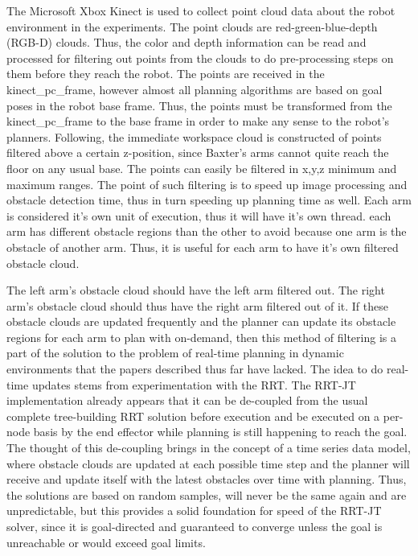 \documentclass[conference]{IEEEtran} \usepackage[T1]{fontenc} \usepackage[backend=biber, style=ieee]{biblatex}
\begin{document}
The Microsoft Xbox Kinect is used to collect point cloud data about the robot environment in the experiments. The point clouds are red-green-blue-depth (RGB-D) clouds. 
Thus, the color and depth information can be read and processed for filtering out points from the clouds to do pre-processing steps on them before they reach the robot. 
The points are received in the kinect\_pc\_frame, however almost all planning algorithms are based on goal poses in the robot base frame. Thus, the points must be 
transformed from the kinect\_pc\_frame to the base frame in order to make any sense to the robot's planners. Following, the immediate workspace cloud is constructed of 
points filtered above a certain z-position, since Baxter's arms cannot quite reach the floor on any usual base. The points can easily be filtered in x,y,z minimum and 
maximum ranges. The point of such filtering is to speed up image processing and obstacle detection time, thus in turn speeding up planning time as well. Each arm is 
considered it's own unit of execution, thus it will have it's own thread. each arm has different obstacle regions than the other to avoid because one arm is the obstacle
of another arm. Thus, it is useful for each arm to have it's own filtered obstacle cloud. 

The left arm's obstacle cloud should have the left arm filtered out. The right arm's obstacle cloud should thus have the right arm filtered out of it. If these obstacle
clouds are updated frequently and the planner can update its obstacle regions for each arm to plan with on-demand, then this method of filtering is a part of the solution
to the problem of real-time planning in dynamic environments that the papers described thus far have lacked. The idea to do real-time updates stems from experimentation
with the RRT. The RRT-JT implementation already appears that it can be de-coupled from the usual complete tree-building RRT solution before execution and be executed on a 
per-node basis by the end effector while planning is still happening to reach the goal. The thought of this de-coupling brings in the concept of a time series data model, 
where obstacle clouds are updated at each possible time step and the planner will receive and update itself with the latest obstacles over time with planning. Thus, the 
solutions are based on random samples, will never be the same again and are unpredictable, but this provides a solid foundation for speed of the RRT-JT solver, since
it is goal-directed and guaranteed to converge unless the goal is unreachable or would exceed goal limits.
\end{document}
